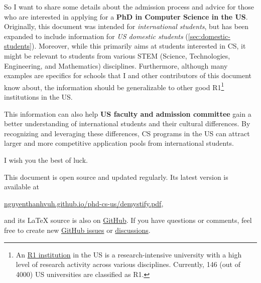 \documentclass[oneside,11pt,dvipsnames]{book}
\begin{document}
So I want to share some details about the admission process and advice for those who are interested in applying for a \textbf{PhD in Computer Science in the US}.
Originally, this document was intended for \emph{international students}, but has been expanded to include information for \emph{US domestic students} (\autoref{sec:domestic-students}).
Moreover, while this primarily aims at students interested in CS, it might be relevant to students from various STEM (Science, Technologies, Engineering, and Mathematics) disciplines.
Furthermore, although many examples are specifics for schools that I and other contributors of this document know about, the information should be generalizable to other good R1\footnote{An \href{https://en.wikipedia.org/wiki/List_of_research_universities_in_the_United_States}{R1 institution} in the US is a research-intensive university with a high level of research activity across various disciplines. Currently, 146 (out of 4000) US universities are classified as R1.} institutions in the US.

This information can also help \textbf{US faculty and admission committee} gain a better understanding of international students and their cultural differences.  By recognizing and leveraging these differences, CS programs in the US can attract larger and more competitive application pools from international students.

I wish you the best of luck.

\begin{mybox}
This document is open source and updated regularly. Its latest version is available at

\begin{center}
  \href{https://nguyenthanhvuh.github.io/phd-cs-us/demystify.pdf}{nguyenthanhvuh.github.io/phd-cs-us/demystify.pdf},
\end{center}

\noindent and its \LaTeX{} source is also on \href{https://github.com/nguyenthanhvuh/phd-cs-us}{GitHub}. If you have questions or comments, feel free to create new \href{https://github.com/nguyenthanhvuh/phd-cs-us/issues}{GitHub issues} or \href{https://github.com/nguyenthanhvuh/phd-cs-us/discussions}{discussions}.

\end{mybox}

\newpage
\tableofcontents
\end{document}
